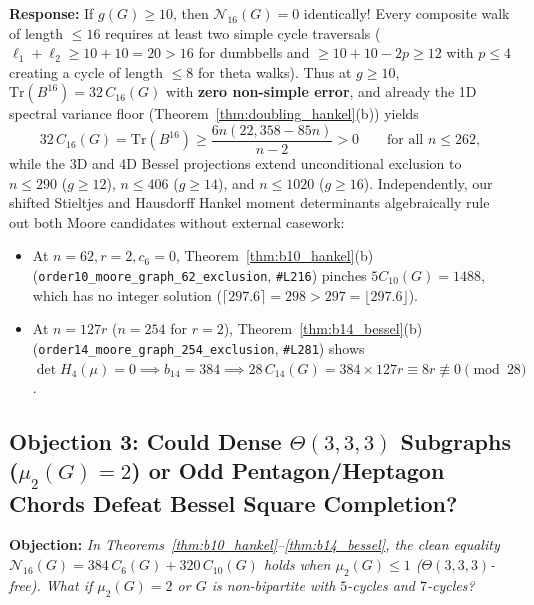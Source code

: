 \documentclass[10pt,a4paper]{article}
\theoremstyle{definition}
\theoremstyle{remark}
\begin{document}
\textbf{Response:} If $g(G) \ge 10$, then $\mathcal{N}_{16}(G) = 0$ identically! Every composite walk of length $\le 16$ requires at least two simple cycle traversals ($\ell_1 + \ell_2 \ge 10 + 10 = 20 > 16$ for dumbbells and $\ge 10 + 10 - 2p \ge 12$ with $p \le 4$ creating a cycle of length $\le 8$ for theta walks). Thus at $g \ge 10$, $\mathrm{Tr}(B^{16}) = 32\,C_{16}(G)$ with \textbf{zero non-simple error}, and already the 1D spectral variance floor (Theorem~\ref{thm:doubling_hankel}(b)) yields
\[
  32\,C_{16}(G) = \mathrm{Tr}(B^{16}) \ge \frac{6n(22{,}358 - 85n)}{n - 2} > 0 \qquad \text{for all } n \le 262,
\]
while the 3D and 4D Bessel projections extend unconditional exclusion to $n \le 290$ ($g \ge 12$), $n \le 406$ ($g \ge 14$), and $n \le 1020$ ($g \ge 16$). Independently, our shifted Stieltjes and Hausdorff Hankel moment determinants algebraically rule out both Moore candidates without external casework:
\begin{itemize}[nosep,leftmargin=1.5em]
  \item At $n = 62, r = 2, c_6 = 0$, Theorem~\ref{thm:b10_hankel}(b) (\texttt{order10\_moore\_graph\_62\_exclusion}, \texttt{\#L216}) pinches $5 C_{10}(G) = 1488$, which has no integer solution ($\lceil 297.6 \rceil = 298 > 297 = \lfloor 297.6 \rfloor$).
  \item At $n = 127r$ ($n=254$ for $r=2$), Theorem~\ref{thm:b14_bessel}(b) (\texttt{order14\_moore\_graph\_254\_exclusion}, \texttt{\#L281}) shows $\det H_4(\mu) = 0 \implies b_{14} = 384 \implies 28\,C_{14}(G) = 384 \times 127r \equiv 8r \not\equiv 0 \pmod{28}$.
\end{itemize}

\subsection{Objection 3: Could Dense $\Theta(3,3,3)$ Subgraphs ($\mu_2(G)=2$) or Odd Pentagon/Heptagon Chords Defeat Bessel Square Completion?}
\textbf{Objection:} \emph{In Theorems~\ref{thm:b10_hankel}--\ref{thm:b14_bessel}, the clean equality $\mathcal{N}_{16}(G) = 384\,C_6(G) + 320\,C_{10}(G)$ holds when $\mu_2(G) \le 1$ ($\Theta(3,3,3)$-free). What if $\mu_2(G) = 2$ or $G$ is non-bipartite with $5$-cycles and $7$-cycles?}
\end{document}
